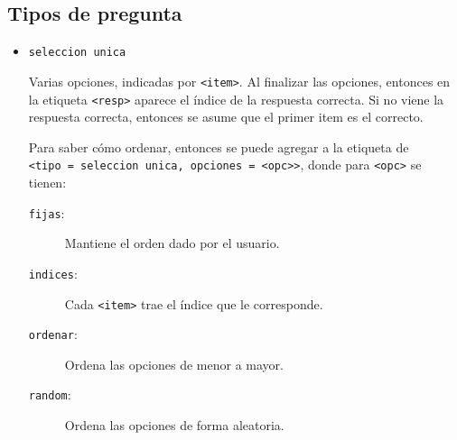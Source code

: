 \documentclass[12pt]{article}
\theoremstyle{definition}
\begin{document}
\subsection{Tipos de pregunta}
\begin{itemize}
  \item \verb|seleccion unica|

    Varias opciones, indicadas por \verb|<item>|. Al finalizar las opciones, entonces en la etiqueta  \verb|<resp>| aparece el índice de la respuesta correcta. Si no viene la respuesta correcta, entonces se asume que el primer item es el correcto.

    Para saber cómo ordenar, entonces se puede agregar a la etiqueta de \\[1ex]
    \verb|<tipo = seleccion unica, opciones = <opc>>|, donde para \verb|<opc>| se tienen:
    \begin{description}
      \item [\texttt{fijas}:]   Mantiene el orden dado por el usuario.
      \item [\texttt{indices}:] Cada \verb|<item>| trae el índice que le corresponde.
      \item [\texttt{ordenar}:] Ordena las opciones de menor a mayor.
      \item [\texttt{random}:]  Ordena las opciones de forma aleatoria.
    \end{description}
\end{itemize}
\end{document}
